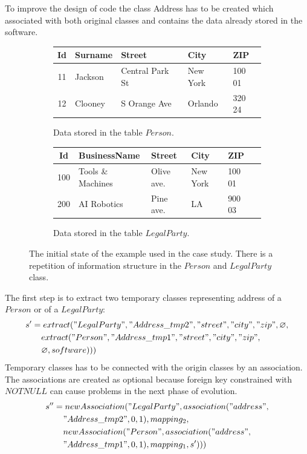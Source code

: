 \documentclass[runningheads]{comsis}
\begin{document}
To improve the design of code the class Address has to be created which associated with both original classes and contains the data already stored in the software. 
\begin{figure}
\begin{subfigure}[b]{\textwidth}
	\centering
	\begin{tabular}{| c | l | l | l | l | }
	 	\hline
		Id &  Surname & Street & City & ZIP  \\ \hline  
		11 & Jackson & Central Park St & New York & 100 01  \\ \hline
		12 & Clooney & S Orange Ave & Orlando & 320 24  \\ \hline
	\end{tabular}
	\caption{Data stored in the table $Person$.}
\end{subfigure}
\begin{subfigure}[b]{\textwidth}
	\centering
	\begin{tabular}{| c | l | l | l | l | c |}
	 	\hline
		Id &  BusinessName & Street & City & ZIP \\ \hline  
		100 & Tools \& Machines & Olive ave. & New York & 100 01 \\ \hline
		200 & AI Robotics & Pine ave. & LA & 900 03  \\ \hline
	\end{tabular}
	\caption{Data stored in the table $LegalParty$.}
\end{subfigure}
	\caption{The initial state of the example used in the case study. There is a repetition of information structure in the $Person$ and $LegalParty$ class.}
	\label{fig:case1}
\end{figure}
The first  step is to extract two temporary classes representing address of a $Person$ or of a $LegalParty$:
\begin{align}
s' &= extract("LegalParty",  "Address\_tmp2", "street", "city", "zip", \varnothing, \nonumber  \\ 
& \;\;\;\; extract("Person", "Address\_tmp1", "street", "city", "zip", \nonumber \\ & \;\;\;\;  \varnothing, software)))
\end{align}
Temporary classes has to be connected with the origin classes by an association. The associations are created as optional because foreign key constrained with $NOTNULL$ can cause problems in the next phase of evolution.
\begin{align}
 s'' &= newAssociation("LegalParty", association("address", \nonumber \\
& \;\;\;\; "Address\_tmp2", 0, 1), mapping_2, \nonumber \\ & \;\;\;\; newAssociation("Person", association("address",\nonumber  \\
& \;\;\;\; "Address\_tmp1", 0, 1), mapping_1, s')))
\end{align}
\end{document}
